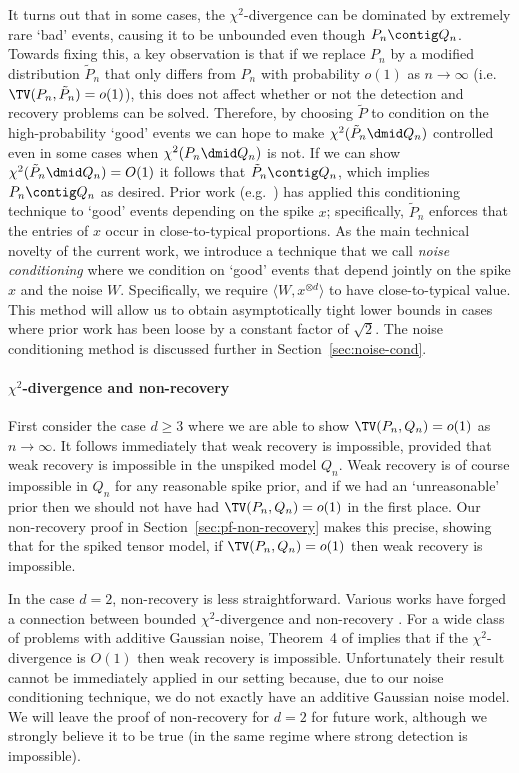 \documentclass{article}
\begin{document}
It turns out that in some cases, the $\chi^2$-divergence can be dominated by extremely rare `bad' events, causing it to be unbounded even though $P_n \contig Q_n$. Towards fixing this, a key observation is that if we replace $P_n$ by a modified distribution $\tilde P_n$ that only differs from $P_n$ with probability $o(1)$ as $n\to\infty$ (i.e.\ $\TV(P_n,\tilde P_n) = o(1)$), this does not affect whether or not the detection and recovery problems can be solved. Therefore, by choosing $\tilde P$ to condition on the high-probability `good' events we can hope to make $\chi^2(\tilde P_n \dmid Q_n)$ controlled even in some cases when $\chi^2(P_n \dmid Q_n)$ is not. If we can show $\chi^2(\tilde P_n \dmid Q_n) = O(1)$ it follows that $\tilde P_n \contig Q_n$, which implies $P_n \contig Q_n$ as desired. Prior work (e.g.\ \cite{bmnn,bmvx,pwbm}) has applied this conditioning technique to `good' events depending on the spike $x$; specifically, $\tilde P_n$ enforces that the entries of $x$ occur in close-to-typical proportions. As the main technical novelty of the current work, we introduce a technique that we call \emph{noise conditioning} where we condition on `good' events that depend jointly on the spike $x$ and the noise $W$. Specifically, we require $\langle W,x^{\otimes d} \rangle$ to have close-to-typical value. This method will allow us to obtain asymptotically tight lower bounds in cases where prior work \cite{mrz,bmvx} has been loose by a constant factor of $\sqrt{2}$. The noise conditioning method is discussed further in Section~\ref{sec:noise-cond}.



\paragraph{$\chi^2$-divergence and non-recovery}

First consider the case $d \ge 3$ where we are able to show $\TV(P_n,Q_n) = o(1)$ as $n\to\infty$. It follows immediately that weak recovery is impossible, provided that weak recovery is impossible in the unspiked model $Q_n$. Weak recovery is of course impossible in $Q_n$ for any reasonable spike prior, and if we had an `unreasonable' prior then we should not have had $\TV(P_n,Q_n) = o(1)$ in the first place. Our non-recovery proof in Section~\ref{sec:pf-non-recovery} makes this precise, showing that for the spiked tensor model, if $\TV(P_n,Q_n) = o(1)$ then weak recovery is impossible.

In the case $d=2$, non-recovery is less straightforward. Various works have forged a connection between bounded $\chi^2$-divergence and non-recovery \cite{bmnn,bmvx}. For a wide class of problems with additive Gaussian noise, Theorem~4 of \cite{bmvx} implies that if the $\chi^2$-divergence is $O(1)$ then weak recovery is impossible. Unfortunately their result cannot be immediately applied in our setting because, due to our noise conditioning technique, we do not exactly have an additive Gaussian noise model. We will leave the proof of non-recovery for $d=2$ for future work, although we strongly believe it to be true (in the same regime where strong detection is impossible).
\end{document}
